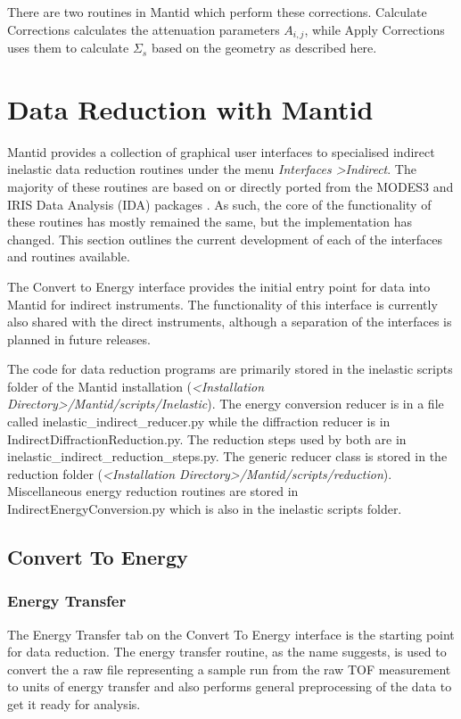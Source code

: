 \documentclass[paper=a4, fontsize=11pt]{scrartcl}	%
\numberwithin{equation}{section}															%
\numberwithin{figure}{section}																%
\numberwithin{table}{section}																%
\begin{document}
There are two routines in Mantid which perform these corrections. Calculate Corrections calculates the attenuation parameters $A_{i,j}$, while Apply Corrections uses them to calculate $\Sigma_s$ based on the geometry as described here.

\section{Data Reduction with Mantid}
Mantid provides a collection of graphical user interfaces to specialised indirect inelastic data reduction routines under the menu \textit{Interfaces \textgreater Indirect}. The majority of these routines are based on or directly ported from the MODES3 and IRIS Data Analysis (IDA) packages \cite{wshowells2010}. As such, the core of the functionality of these routines has mostly remained the same, but the implementation has changed. This section outlines the current development of each of the interfaces and routines available.

The Convert to Energy interface provides the initial entry point for data into Mantid for indirect instruments. The functionality of this interface is currently also shared with the direct instruments, although a separation of the interfaces is planned in future releases.

The code for data  reduction programs are primarily stored in the inelastic scripts folder of the Mantid installation (\textit{\textless Installation Directory\textgreater /Mantid/scripts/Inelastic}). The energy conversion reducer is in a file called inelastic\_indirect\_reducer.py while the diffraction reducer is in IndirectDiffractionReduction.py. The reduction steps used by both are in inelastic\_indirect\_reduction\_steps.py. The generic reducer class is stored in the reduction folder (\textit{\textless Installation Directory\textgreater/Mantid/scripts/reduction}). Miscellaneous energy reduction routines are stored in IndirectEnergyConversion.py which is also in the inelastic scripts folder.

\subsection{Convert To Energy}
\subsubsection{Energy Transfer}
\label{sec:energy-transfer}
The Energy Transfer tab on the Convert To Energy interface is the starting point for data reduction. The energy transfer routine, as the name suggests, is used to convert the a raw file representing a sample run from the raw TOF measurement to units of energy transfer and also performs general preprocessing of the data to get it ready for analysis.
\end{document}
